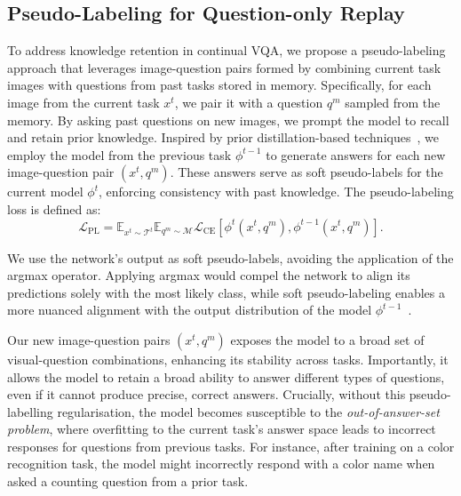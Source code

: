 \subsection{Pseudo-Labeling for Question-only Replay}
To address knowledge retention in continual VQA, we propose a pseudo-labeling approach that leverages image-question pairs formed by combining current task images with questions from past tasks stored in memory. Specifically, for each image from the current task $x^{t}$, we pair it with a question $q^{m}$ sampled from the memory. By asking past questions on new images, we prompt the model to recall and retain prior knowledge. Inspired by prior distillation-based techniques~\citep{li2017lwf, dhar2019learning}, we employ the model from the previous task $\phi^{t-1}$ to generate answers for each new image-question pair $(x^t, q^m)$. These answers serve as soft pseudo-labels for the current model $\phi^{t}$, enforcing consistency with past knowledge. The pseudo-labeling loss is defined as:
\begin{equation}
    \label{eq.trad_feat}
    \mathcal{L}_{\text{PL}} = \mathbb{E}_{x^t\sim \mathcal{T}^t}\mathbb{E}_{q^m\sim \mathcal{M}}\mathcal{L}_{\text{CE}}\left[\phi^{t}(x^t,q^m),\phi^{t-1}(x^t,q^m)\right].
\end{equation}

We use the network's output as soft pseudo-labels, avoiding the application of the argmax operator. Applying argmax would compel the network to align its predictions solely with the most likely class, while soft pseudo-labeling enables a more nuanced alignment with the output distribution of the model $\phi^{t-1}$~\citep{hinton2015distilling, zhang2021refining, learning-soft-labels}. 

Our new image-question pairs $(x^t,q^m)$ exposes the model to a broad set of visual-question combinations, enhancing its stability across tasks. Importantly, it allows the model to retain a broad ability to answer different types of questions, even if it cannot produce precise, correct answers. Crucially, without this pseudo-labelling regularisation, the model becomes susceptible to the \textit{out-of-answer-set problem}, where overfitting to the current task's answer space leads to incorrect responses for questions from previous tasks. For instance, after training on a color recognition task, the model might incorrectly respond with a color name when asked a counting question from a prior task.

